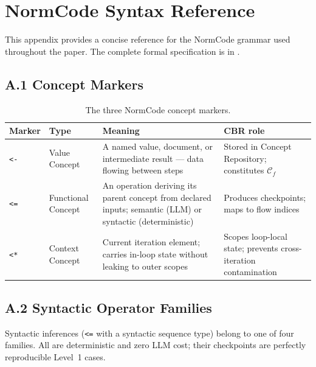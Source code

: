 \appendix

\section{NormCode Syntax Reference}
\label{app:syntax}

This appendix provides a concise reference for the NormCode grammar used throughout the
paper. The complete formal specification is in \cite{guan2026normcodesemiformallanguageauditable}.

\subsection*{A.1 Concept Markers}

\begin{table}[h]
\centering
\caption{The three NormCode concept markers.}
\label{tab:markers}
\begin{tabular}{@{}p{1.4cm}p{2.4cm}p{4.0cm}p{3.4cm}@{}}
\toprule
\textbf{Marker} & \textbf{Type} & \textbf{Meaning} & \textbf{CBR role} \\
\midrule
\texttt{<-} & Value Concept   & A named value, document, or intermediate result --- data flowing between steps & Stored in Concept Repository; constitutes $\mathcal{C}_f$ \\[4pt]
\texttt{<=} & Functional Concept & An operation deriving its parent concept from declared inputs; semantic (LLM) or syntactic (deterministic) & Produces checkpoints; maps to flow indices \\[4pt]
\texttt{<*} & Context Concept & Current iteration element; carries in-loop state without leaking to outer scopes & Scopes loop-local state; prevents cross-iteration contamination \\
\bottomrule
\end{tabular}
\end{table}

\subsection*{A.2 Syntactic Operator Families}

Syntactic inferences (\texttt{<=} with a syntactic sequence type) belong to one of four
families. All are deterministic and zero LLM cost; their checkpoints are perfectly
reproducible Level~1 cases.

